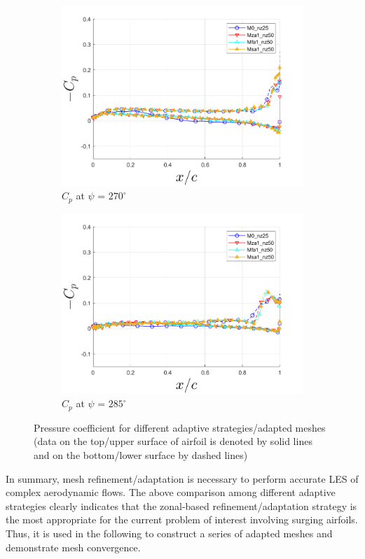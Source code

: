 \begin{figure}[H]
\begin{subfigure}[b]{0.475\textwidth}
\includegraphics[width=1\textwidth]{figures/Results/Cp_plots/Cp_ph_270.png}
\caption{ $C_p$ at $\psi$ = $270^\circ$}
\label{fig:Cp_270}
\end{subfigure}
\begin{subfigure}[b]{0.475\textwidth}
\centering
\includegraphics[width=1\textwidth]{figures/Results/Cp_plots/Cp_ph_285.png}
\caption{ $C_p$ at $\psi$ = $285^\circ$}
\label{fig:Cp_285}
\end{subfigure}
\caption{Pressure coefficient for different adaptive strategies/adapted meshes (data on the top/upper surface of airfoil is denoted by solid lines and on the bottom/lower surface by dashed lines)}
\label{fig:Cp_plots}
\end{figure}

In summary, mesh refinement/adaptation is necessary to perform accurate LES of complex aerodynamic flows. The above comparison among different adaptive strategies clearly indicates that the zonal-based refinement/adaptation strategy is the most appropriate for the current problem of interest involving surging airfoils. Thus, it is used in the following to construct a series of adapted meshes and demonstrate mesh convergence.